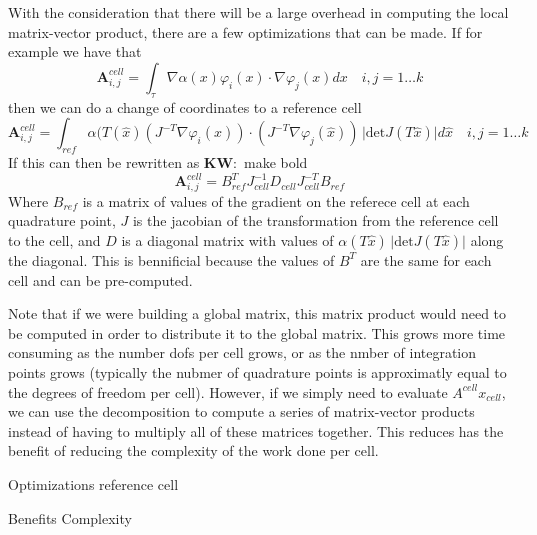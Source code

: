 \documentclass[12pt]{article}
\newcommand{\KW}[1]{{\color{blue}\textbf{KW}:~#1}}
\begin{document}
With the consideration that there will be a large overhead in computing the local matrix-vector product, there are a few optimizations that can be made. If for example we have that 
$$\mathbf{A}^{cell}_{i,j} = \int_{\tau}\nabla \alpha(x) \varphi_{i}(x) \cdot \nabla \varphi_{j}(x) dx\quad i,j = 1 \ldots k$$ 
then we can do a change of coordinates to a reference cell
$$\mathbf{A}^{cell}_{i,j} = \int_{ref} \alpha(T(\hat{x}) (J^{-T}\nabla \varphi_{i}(\hat{x})) \cdot (J^{-T}\nabla \varphi_{j}(\hat{x}))\,\vert \mathrm{det}J(T\hat{x}) \vert d\hat{x} \quad i,j = 1 \ldots k$$ 
If this can then be rewritten as 
\KW{make bold}
$$\mathbf{A}^{cell}_{i,j} = B^{T}_{ref}J^{-1}_{cell}D_{cell}J^{-T}_{cell}B_{ref}$$
Where $B_{ref}$ is a matrix of values of the gradient on the referece cell at each quadrature point, $J$ is the jacobian of the transformation from the reference cell to the cell, and $D$ is a diagonal matrix with values of $\alpha(T\hat{x})\, \vert \mathrm{det}J(T\hat{x}) \vert$ along the diagonal. This is bennificial because the  values of $B^{T}$ are the same for each cell and can be pre-computed.

Note that if we were building a global matrix, this matrix product would need to be computed in order to distribute it to the global matrix. This grows more time consuming as the number dofs per cell grows, or as the nmber of integration points grows (typically the nubmer of quadrature points is approximatly equal to the degrees of freedom per cell). However, if we simply need to evaluate $A^{cell}x_{cell}$, we can use the decomposition to compute a series of matrix-vector products instead of having to multiply all of these matrices together. This reduces has the benefit of reducing the complexity of the work done per cell. 





Optimizations reference cell 

Benefits Complexity 
\end{document}
